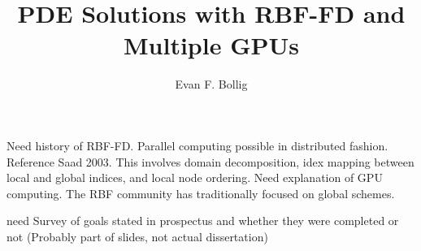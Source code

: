 \documentclass[11pt]{fsuthesis}
\title{PDE Solutions with RBF-FD and Multiple GPUs}
\author{Evan F. Bollig}
\begin{document}

\mainmatter

Need history of RBF-FD. 
Parallel computing possible in distributed fashion. Reference Saad 2003. This involves domain decomposition, idex mapping between local and global indices, and local node ordering. 
Need explanation of GPU computing. 
The RBF community has traditionally focused on global schemes. 




 
 
 



need Survey of goals stated in prospectus and whether they were completed or not (Probably part of slides, not actual dissertation)
\end{document}

